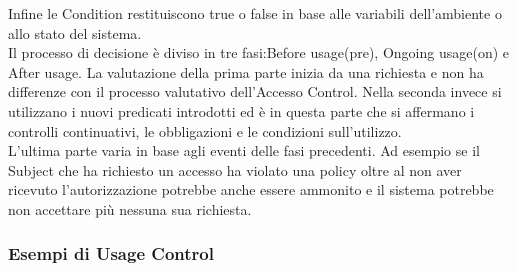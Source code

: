 Infine le Condition restituiscono true o false in base alle variabili dell'ambiente o allo stato del sistema.\\
Il processo di decisione è diviso in tre fasi\cite{SurveyUsageControl}:Before usage(pre), Ongoing usage(on) e After usage.
La valutazione della prima parte inizia da una richiesta e non ha differenze con il processo valutativo dell'Accesso Control.
Nella seconda invece si utilizzano i nuovi predicati introdotti ed è in questa parte che si affermano i controlli continuativi,
le obbligazioni e le condizioni sull'utilizzo.\\
L'ultima parte varia in base agli eventi delle fasi precedenti. Ad esempio se il Subject che ha richiesto un accesso ha violato
una policy oltre al non aver ricevuto l'autorizzazione potrebbe anche essere ammonito e il sistema potrebbe non accettare più
nessuna sua richiesta.

\subsubsection{Esempi di Usage Control}
\label{subs:Esempi}
